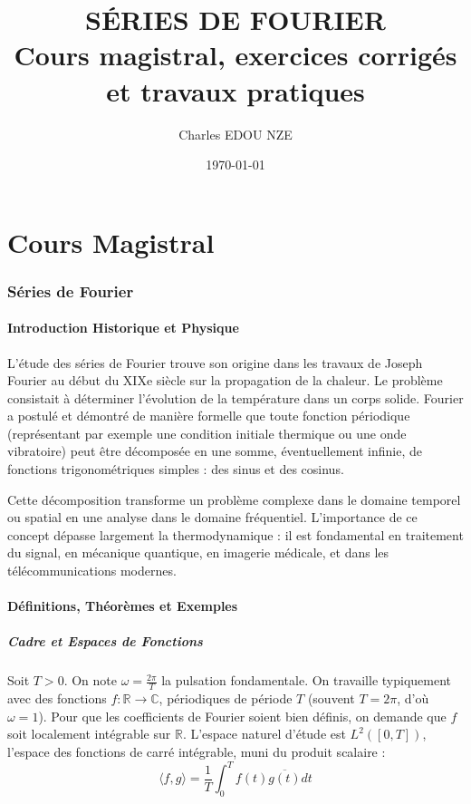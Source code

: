 \documentclass[11pt,a4paper]{article}
\title{\Huge SÉRIES DE FOURIER \\ \large Cours magistral, exercices corrigés et travaux pratiques}
\author{\Large Charles EDOU NZE}
\date{\today}
\begin{document}
\maketitle
\tableofcontents
\newpage

\part{Cours Magistral}

\section{Séries de Fourier}

\subsection{Introduction Historique et Physique}

L'étude des séries de Fourier trouve son origine dans les travaux de Joseph Fourier au début du XIXe siècle sur la propagation de la chaleur. Le problème consistait à déterminer l'évolution de la température dans un corps solide. Fourier a postulé et démontré de manière formelle que toute fonction périodique (représentant par exemple une condition initiale thermique ou une onde vibratoire) peut être décomposée en une somme, éventuellement infinie, de fonctions trigonométriques simples : des sinus et des cosinus.

Cette décomposition transforme un problème complexe dans le domaine temporel ou spatial en une analyse dans le domaine fréquentiel. L'importance de ce concept dépasse largement la thermodynamique : il est fondamental en traitement du signal, en mécanique quantique, en imagerie médicale, et dans les télécommunications modernes.

\subsection{Définitions, Théorèmes et Exemples}

\subsubsection*{Cadre et Espaces de Fonctions}

Soit $T > 0$. On note $\omega = \frac{2\pi}{T}$ la pulsation fondamentale.
On travaille typiquement avec des fonctions $f : \mathbb{R} \to \mathbb{C}$, périodiques de période $T$ (souvent $T = 2\pi$, d'où $\omega = 1$).
Pour que les coefficients de Fourier soient bien définis, on demande que $f$ soit localement intégrable sur $\mathbb{R}$. L'espace naturel d'étude est $L^2([0, T])$, l'espace des fonctions de carré intégrable, muni du produit scalaire :
$$ \langle f, g \rangle = \frac{1}{T} \int_0^T f(t) \overline{g(t)} dt $$
\end{document}
